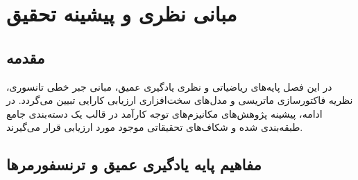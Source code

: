 \documentclass[12pt,a4paper]{report}
\theoremstyle{definition}
\begin{document}
\chapter{مبانی نظری و پیشینه تحقیق}
\label{chap:theory}

\section{مقدمه}
در این فصل پایه‌های ریاضیاتی و نظری یادگیری عمیق، مبانی جبر خطی تانسوری، نظریه فاکتورسازی ماتریسی و مدل‌های سخت‌افزاری ارزیابی کارایی تبیین می‌گردد. در ادامه، پیشینه پژوهش‌های مکانیزم‌های توجه کارآمد در قالب یک دسته‌بندی جامع طبقه‌بندی شده و شکاف‌های تحقیقاتی موجود مورد ارزیابی قرار می‌گیرند.

\section{مفاهیم پایه یادگیری عمیق و ترنسفورمرها}
\end{document}
